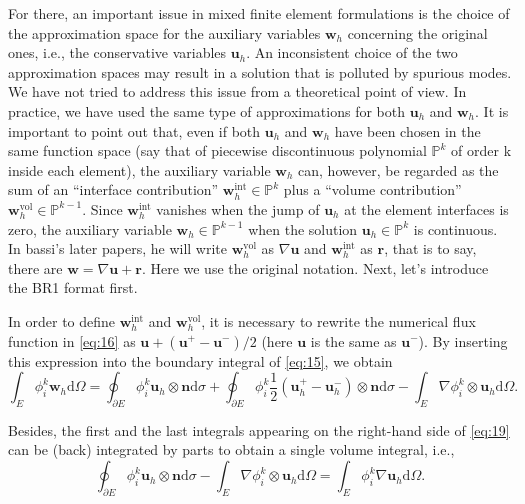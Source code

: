 \documentclass{develop-note}
\begin{document}
For there, an important issue in mixed finite element formulations is the choice of the approximation space for the auxiliary variables $\mathbf{w}_{h}$ concerning the original ones, i.e., the conservative variables $\mathbf{u}_{h}$. An inconsistent choice of the two approximation spaces may result in a solution that is polluted by spurious modes. We have not tried to address this issue from a theoretical point of view. In practice, we have used the same type of approximations for both $\mathbf{u}_{h}$ and $\mathbf{w}_{h}$. It is important to point out that, even if both $\mathbf{u}_{h}$ and $\mathbf{w}_{h}$ have been chosen in the same function space (say that of piecewise discontinuous polynomial $\mathbb{P}^{k}$ of order k inside each element), the auxiliary variable $\mathbf{w}_{h}$ can, however, be regarded as the sum of an ``interface contribution'' $\mathbf{w}_{h}^{\mathrm{int}}\in\mathbb{P}^{k}$ plus a ``volume contribution'' $\mathbf{w}_{h}^{\mathrm{vol}}\in\mathbb{P}^{k-1}$. Since $\mathbf{w}_{h}^{\mathrm{int}}$ vanishes when the jump of $\mathbf{u}_{h}$ at the element interfaces is zero, the auxiliary variable $\mathbf{w}_{h}\in\mathbb{P}^{k-1}$ when the solution $\mathbf{u}_{h}\in\mathbb{P}^{k}$ is continuous. In bassi's later papers, he will write $\mathbf{w}_{h}^{\mathrm{vol}}$ as $\nabla\mathbf{u}$ and $\mathbf{w}_{h}^{\mathrm{int}}$ as $\mathbf{r}$, that is to say, there are $\mathbf{w}=\nabla\mathbf{u}+\mathbf{r}$. Here we use the original notation. Next, let's introduce the BR1 format first.

In order to define $\mathbf{w}_{h}^{\mathrm{int}}$ and $\mathbf{w}_{h}^{\mathrm{vol}}$, it is necessary to rewrite the numerical flux function in \autoref{eq:16} as $\mathbf{u}+(\mathbf{u}^{+}-\mathbf{u}^{-})/2$ (here $\mathbf{u}$ is the same as $\mathbf{u}^{-}$). By inserting this expression into the boundary integral of \autoref{eq:15}, we obtain
\begin{equation}
  \label{eq:19}
  \int_{E}\phi_{i}^{k}\mathbf{w}_{h}\mathrm{d}\Omega=\oint_{\partial E}\phi_{i}^{k}\mathbf{u}_{h}\otimes\mathbf{n}\mathrm{d}\sigma+\oint_{\partial E}\phi_{i}^{k}\dfrac{1}{2}(\mathbf{u}_{h}^{+}-\mathbf{u}_{h}^{-})\otimes\mathbf{n}\mathrm{d}\sigma-\int_{E}\nabla\phi_{i}^{k}\otimes\mathbf{u}_{h}\mathrm{d}\Omega.
\end{equation}

Besides, the first and the last integrals appearing on the right-hand side of \autoref{eq:19} can be (back) integrated by parts to obtain a single volume integral, i.e.,
\begin{equation}
  \oint_{\partial E}\phi_{i}^{k}\mathbf{u}_{h}\otimes\mathbf{n}\mathrm{d}\sigma-\int_{E}\nabla\phi_{i}^{k}\otimes\mathbf{u}_{h}\mathrm{d}\Omega=\int_{E}\phi_{i}^{k}\nabla\mathbf{u}_{h}\mathrm{d}\Omega.
\end{equation}
\end{document}
